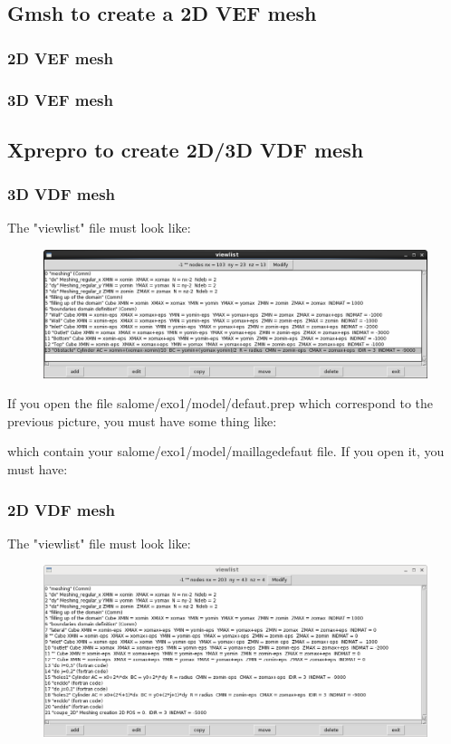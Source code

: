 \documentclass[english]{article}
\begin{document}
\subsection{Gmsh to create a 2D VEF mesh}
\subsubsection{2D VEF mesh}

\subsubsection{3D VEF mesh}



\subsection{Xprepro to create 2D/3D VDF mesh}

\subsubsection{3D VDF mesh}
The "viewlist" file must look like:
\begin{figure}[h]
\includegraphics[width=1.1\textwidth]{xprepro_exo1_default_prep.png}
\end{figure}

If you open the file salome/exo1/model/defaut.prep which correspond to the previous picture, you must have some thing like:


which contain your salome/exo1/model/maillagedefaut file. If you open it, you must have:


\newpage
\subsubsection{2D VDF mesh}
The "viewlist" file must look like:
\begin{figure}[h]
\includegraphics[width=1.1\textwidth]{xprepro_exo2_default_prep.png}
\end{figure}
\end{document}
